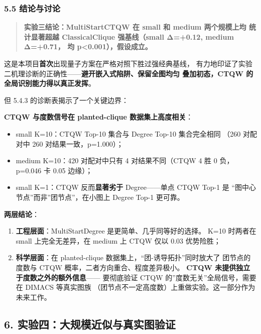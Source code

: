 \documentclass[
  11pt,
]{ctexart}
\providecommand{\tightlist}{%
  \setlength{\itemsep}{0pt}\setlength{\parskip}{0pt}}
\begin{document}
\subsubsection{5.5 结论与讨论}\label{ux7ed3ux8bbaux4e0eux8ba8ux8bba}

\begin{quote}
\textbf{实验三结论：MultiStartCTQW 在 small 和 medium 两个规模上均
统计显著超越 ClassicalClique 强基线（small Δ=+0.12, medium Δ=+0.71， 均
p\textless0.001），假设成立。}
\end{quote}

这是本项目\textbf{首次}出现量子方案在严格对照下胜过强经典基线，
有力地印证了实验二机理诊断的正确性------\textbf{避开嵌入式陷阱、保留全图均匀
叠加初态，CTQW 的全局识别能力得以真正发挥}。

但 5.4.3 的诊断表揭示了一个关键边界：

\textbf{CTQW 与度数信号在 planted-clique 数据集上高度相关}：

\begin{itemize}
\tightlist
\item
  small K=10：CTQW Top-10 集合与 Degree Top-10 集合完全相同 （260
  对配对中 260 对结果一致，p=1.000）；
\item
  medium K=10：420 对配对中只有 4 对结果不同（CTQW 4 胜 0 负， p=0.046
  卡 0.05 边缘）；
\item
  small K=1：CTQW 反而\textbf{显著劣于} Degree------单点 CTQW Top-1 是
  ``图中心节点''而非''团节点''，在小图上 Degree Top-1 更可靠。
\end{itemize}

\textbf{两层结论}：

\begin{enumerate}
\def\labelenumi{\arabic{enumi}.}
\tightlist
\item
  \textbf{工程层面}：MultiStartDegree 是更简单、几乎同等好的选择。 K=10
  时两者在 small 上完全无差异，在 medium 上 CTQW 仅以 0.03 优势险胜；
\item
  \textbf{科学层面}：在 planted-clique
  数据集上，``团-诱导拓扑''同时放大了 团节点的度数与 CTQW
  概率，二者方向重合、程度差异极小。 \textbf{CTQW
  未提供独立于度数之外的额外信息}------ 要彻底验证 CTQW
  的''度数无关''全局信号，需要在 DIMACS 等真实图族
  （团节点不一定高度数）上重做实验。这一部分作为未来工作。
\end{enumerate}

\subsection{6.
实验四：大规模近似与真实图验证}\label{ux5b9eux9a8cux56dbux5927ux89c4ux6a21ux8fd1ux4f3cux4e0eux771fux5b9eux56feux9a8cux8bc1}
\end{document}

